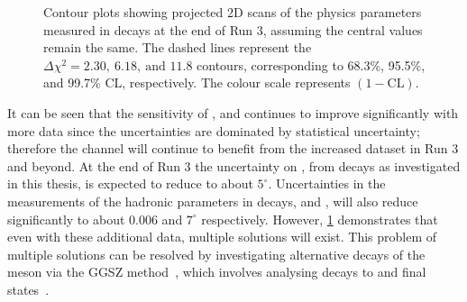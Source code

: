 \begin{figure}[h]
\centering
{}
\caption{Contour plots showing projected 2D scans of the physics parameters measured in \btodkst decays at the end of Run 3, assuming the central values remain the same. The dashed lines represent the $\Delta \chi^2 = 2.30,\ 6.18,\ \text{and } 11.8$ contours, corresponding to 68.3\%, 95.5\%, and 99.7\% CL, respectively. The colour scale represents $(1 - \text{CL})$.}
\label{gammadiniplotsrun3}
\end{figure}

It can be seen that the sensitivity of \rb, \deltab and \Pgamma continues to improve significantly with more data since the uncertainties are dominated by statistical uncertainty; therefore the \btodkst channel will continue to benefit from the increased dataset in Run 3 and beyond. At the end of Run 3 the uncertainty on \Pgamma, from \btodkst decays as investigated in this thesis, is expected to reduce to about $5^{\circ}$. Uncertainties in the measurements of the hadronic parameters in \btodkst decays, \rb and \deltab, will also reduce significantly to about $0.006$ and $7^{\circ}$ respectively. However, \fig\ref{gammadiniplotsrun3} demonstrates that even with these additional data, multiple solutions will exist. This problem of multiple solutions can be resolved by investigating alternative decays of the \Dz meson via the GGSZ method~\cite{GGSZ}, which involves analysing \Dz decays to \KS\pip\pim and \KS\Kp\Km final states~\cite{LHCb-PAPER-2012-027,LHCb-PAPER-2014-041}.


